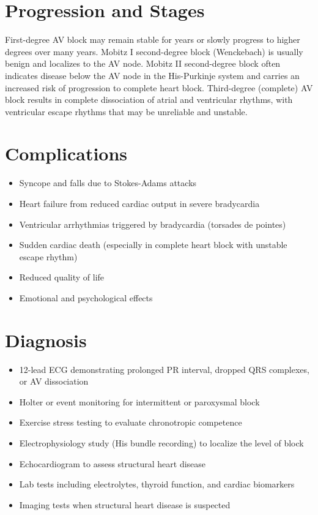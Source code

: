 \section{Progression and Stages}
First-degree AV block may remain stable for years or slowly progress to higher degrees over many years. Mobitz I second-degree block (Wenckebach) is usually benign and localizes to the AV node. Mobitz II second-degree block often indicates disease below the AV node in the His-Purkinje system and carries an increased risk of progression to complete heart block. Third-degree (complete) AV block results in complete dissociation of atrial and ventricular rhythms, with ventricular escape rhythms that may be unreliable and unstable.

\section{Complications}

\begin{itemize}[noitemsep]
  \item Syncope and falls due to Stokes-Adams attacks
  \item Heart failure from reduced cardiac output in severe bradycardia
  \item Ventricular arrhythmias triggered by bradycardia (torsades de pointes)
  \item Sudden cardiac death (especially in complete heart block with unstable escape rhythm)
  \item Reduced quality of life
  \item Emotional and psychological effects
\end{itemize}

\section{Diagnosis}

\begin{itemize}[noitemsep]
  \item 12-lead ECG demonstrating prolonged PR interval, dropped QRS complexes, or AV dissociation
  \item Holter or event monitoring for intermittent or paroxysmal block
  \item Exercise stress testing to evaluate chronotropic competence
  \item Electrophysiology study (His bundle recording) to localize the level of block
  \item Echocardiogram to assess structural heart disease
  \item Lab tests including electrolytes, thyroid function, and cardiac biomarkers
  \item Imaging tests when structural heart disease is suspected
\end{itemize}

